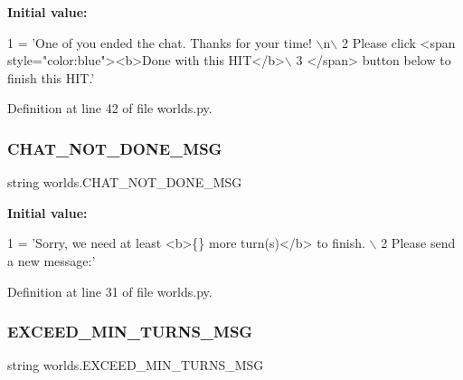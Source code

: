 {\bfseries Initial value\+:}
\begin{DoxyCode}
1 =  \textcolor{stringliteral}{'One of you ended the chat. Thanks for your time! \(\backslash\)n\(\backslash\)}
2 \textcolor{stringliteral}{        Please click <span style="color:blue"><b>Done with this HIT</b>\(\backslash\)}
3 \textcolor{stringliteral}{        </span> button below to finish this HIT.'}
\end{DoxyCode}


Definition at line 42 of file worlds.\+py.

\mbox{\label{namespaceworlds_a73dde532230620d581e7e12ac6ffd57a}} 
\subsubsection{\texorpdfstring{C\+H\+A\+T\+\_\+\+N\+O\+T\+\_\+\+D\+O\+N\+E\+\_\+\+M\+SG}{CHAT\_NOT\_DONE\_MSG}}
{\footnotesize\ttfamily string worlds.\+C\+H\+A\+T\+\_\+\+N\+O\+T\+\_\+\+D\+O\+N\+E\+\_\+\+M\+SG}

{\bfseries Initial value\+:}
\begin{DoxyCode}
1 =  \textcolor{stringliteral}{'Sorry, we need at least <b>\{\} more turn(s)</b> to finish. \(\backslash\)}
2 \textcolor{stringliteral}{       Please send a new message:'}
\end{DoxyCode}


Definition at line 31 of file worlds.\+py.

\mbox{\label{namespaceworlds_a2d3d444358504bb81ed5030aec45d19f}} 
\subsubsection{\texorpdfstring{E\+X\+C\+E\+E\+D\+\_\+\+M\+I\+N\+\_\+\+T\+U\+R\+N\+S\+\_\+\+M\+SG}{EXCEED\_MIN\_TURNS\_MSG}}
{\footnotesize\ttfamily string worlds.\+E\+X\+C\+E\+E\+D\+\_\+\+M\+I\+N\+\_\+\+T\+U\+R\+N\+S\+\_\+\+M\+SG}

